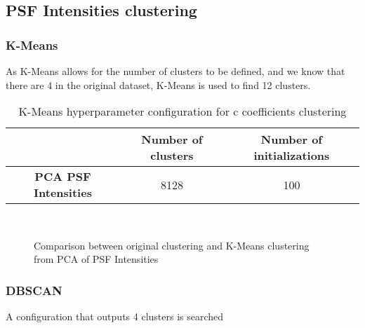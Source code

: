 	\subsection{PSF Intensities clustering}

		\subsubsection{K-Means}
			
			As K-Means allows for the number of clusters to be defined, and we know that there are 4 in the original dataset, K-Means is used to find 12 clusters.
			
			\begin{table}[h!]
				\centering
				\begin{tabular}{|c|c|c|}
					\hline
					& \textbf{Number of clusters} & \textbf{Number of initializations}\\
					\hline
					\textbf{PCA PSF Intensities} & 8128 & 100\\
					\hline
				\end{tabular}
				\caption{K-Means hyperparameter configuration for c coefficients clustering}
			\end{table}
		
			\begin{figure*}[ht!]
				\centering
				\hspace{\fill}
				\\
					
				\hspace{\fill}
				\caption{Comparison between original clustering and K-Means clustering from PCA of PSF Intensities}
			\end{figure*}
			\FloatBarrier
		
		\subsubsection{DBSCAN}
			
			A configuration that outputs 4 clusters is searched
			
